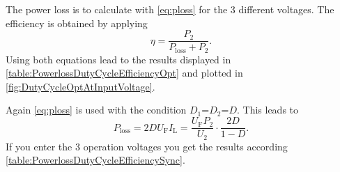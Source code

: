 \begin{solutionblock}
	The power loss is to calculate with \eqref{eq:ploss} for the 3 different voltages.
	The efficiency is obtained by applying
	\begin{equation}
		\eta = \frac{P_\mathrm{2}}{P_\mathrm{loss}+P_\mathrm{2}}.
	\end{equation}
	Using both equations lead to the results displayed in \autoref{table:PowerlossDutyCycleEfficiencyOpt}
	and plotted in \autoref{fig:DutyCycleOptAtInputVoltage}.

	
	

\end{solutionblock}


\begin{solutionblock}
	Again \eqref{eq:ploss} is used with the condition $D_1$=$D_2$=$D$. This leads to
	\begin{equation}
		P_\mathrm{loss}=2D U_\mathrm{F} I_\mathrm{L} = \frac{U_\mathrm{F} P_\mathrm{2}}{U_\mathrm{2}} \cdot \frac{2D}{1-D}.
	\end{equation}
	If you enter the 3 operation voltages you get the results according \autoref{table:PowerlossDutyCycleEfficiencySync}.
	

\end{solutionblock}


